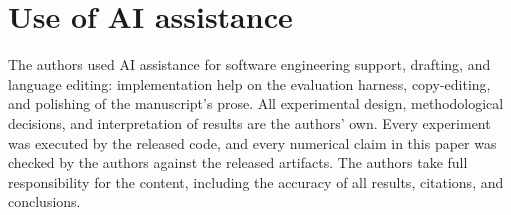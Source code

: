 \section*{Use of AI assistance}

The authors used AI assistance for software engineering support, drafting, and
language editing: implementation help on the evaluation harness, copy-editing,
and polishing of the manuscript's prose. All experimental design, methodological
decisions, and interpretation of results are the authors' own. Every experiment
was executed by the released code, and every numerical claim in this paper was
checked by the authors against the released artifacts. The authors take full
responsibility for the content, including the accuracy of all results,
citations, and conclusions.

